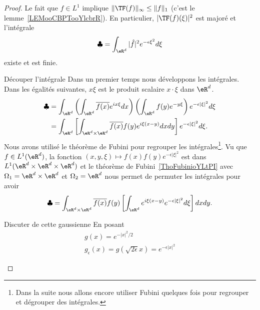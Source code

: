 \begin{proof}
    Le fait que \( f\in L^1\) implique \( \| \TF(f) \|_{\infty}\leq \| f \|_1\) (c'est le lemme~\ref{LEMooCBPTooYlcbrR}). En particulier, \( | \TF(f)(\xi) |^2\) est majoré et l'intégrale
    \begin{equation}
        \clubsuit=\int_{\eR^d}| \hat f |^2 e^{-\epsilon\xi^2}d\xi
    \end{equation}
    existe et est finie.
    \begin{subproof}
        \item[Découper l'intégrale]
    Dans un premier temps nous développons les intégrales. Dans les égalités suivantes, \( x\xi\) est le produit scalaire \( x\cdot \xi\) dans \( \eR^d\).
    \begin{subequations}
        \begin{align}
            \clubsuit&=\int_{\eR^d}\left( \int_{\eR^d} \overline{ f(x) } e^{ix\xi}dx \right)\left( \int_{\eR^d} f(y)  e^{-y\xi} \right) e^{- \epsilon | \xi |^2}d\xi\\
            &=\int_{\eR^d}\left[ \int_{\eR^d\times \eR^d}  \overline{ f(x) }  f(y) e^{i\xi(x-y)}dxdy \right] e^{-\epsilon| \xi |^2}d\xi.
        \end{align}
    \end{subequations}
    Nous avons utilisé le théorème de Fubini pour regrouper les intégrales\footnote{Dans la suite nous allons encore utiliser Fubini quelques fois pour regrouper et dégrouper des intégrales.}. Vu que \( f\in L^1(\eR^d)\), la fonction \( (x,y,\xi)\mapsto f(x)f(y) e^{-\epsilon| \xi |^2}\) est dans \( L^1(\eR^d\times \eR^d\times \eR^d)\) et le théorème de Fubini~\ref{ThoFubinioYLtPI} avec \( \Omega_1=\eR^d\times \eR^d\) et \( \Omega_2=\eR^d\)  nous permet de permuter les intégrales pour avoir
    \begin{equation}        \label{EQooSUYWooCmtFeF}
        \clubsuit=\int_{\eR^d\times \eR^d} \overline{ f(x) }f(y)  \left[ \int_{\eR^d} e^{i\xi(x-y)} e^{-\epsilon| \xi |^2}d\xi \right]dxdy.
    \end{equation}
    \item[Discuter de cette gaussienne]
        En posant
        \begin{subequations}
            \begin{align}
                g(x)= e^{-| x |^2/2}\\
                g_{\epsilon}(x)=g(\sqrt{ 2\epsilon }x)= e^{-\epsilon| x |^2}
            \end{align}
        \end{subequations}

\end{subproof}
\end{proof}
